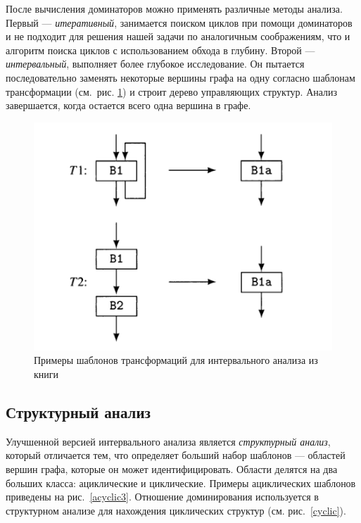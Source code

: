 \documentclass[14pt]{matmex-diploma}
\begin{document}
После вычисления доминаторов можно применять различные методы анализа.
Первый --- \emph{итеративный},
занимается поиском циклов при помощи доминаторов и не подходит для решения 
нашей задачи по аналогичным соображениям, что и алгоритм поиска циклов с использованием
обхода в глубину.
Второй --- \emph{интервальный}, выполняет более глубокое исследование. Он 
пытается последовательно заменять некоторые вершины графа
на одну согласно шаблонам трансформации (см.~рис. \ref{interval-transformations}) и
 строит дерево управляющих структур. 
Анализ завершается, когда остается всего одна вершина в графе.
\begin{figure}[H]
\centering
\includegraphics[scale=0.8]{images/t12.png}
\caption{Примеры шаблонов трансформаций для интервального анализа из книги \cite{muchnick1997advanced}}
\label{interval-transformations}
\end{figure}


\subsection{Структурный анализ}
Улучшенной версией
интервального анализа является \emph{структурный анализ}, который отличается тем, что 
определяет
больший набор шаблонов --- областей вершин графа, которые он может идентифицировать. 
Области делятся
на два больших класса: ациклические и циклические. Примеры ациклических шаблонов
приведены на рис.~\ref{acyclic3}.
Отношение доминирования используется в структурном анализе для нахождения
циклических структур (см. рис.~\ref{cyclic}).
\end{document}
